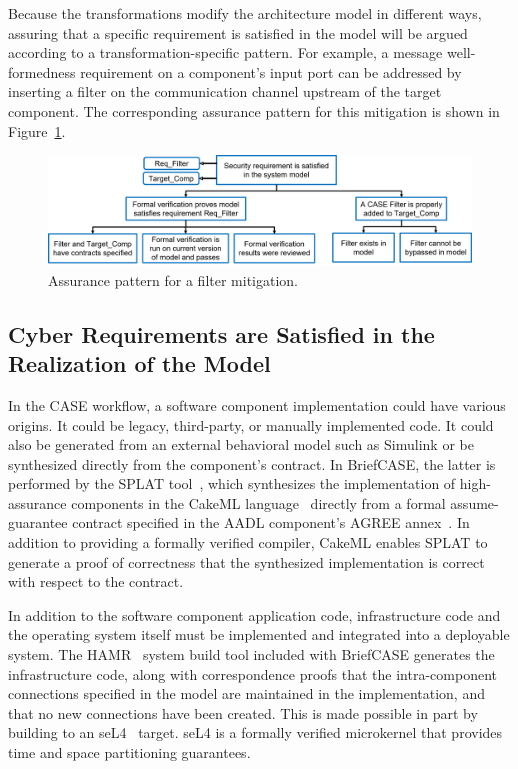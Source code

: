 Because the transformations modify the architecture model in different ways, assuring that a specific requirement is satisfied in the model will be argued according to a transformation-specific pattern.  For example, a message well-formedness requirement on a component's input port can be addressed by inserting a filter on the communication channel upstream of the target component.  The corresponding assurance pattern for this mitigation is shown in Figure~\ref{fig:filter}.

\begin{figure}[h] 
	\centering 
	\includegraphics[width=\textwidth]{figs/filter.png}
	\caption{Assurance pattern for a filter mitigation.}
	\label{fig:filter} 
\end{figure}

\subsection{Cyber Requirements are Satisfied in the Realization of the Model}

In the CASE workflow, a software component implementation could have various origins.  It could be legacy, third-party, or manually implemented code. It could also be generated from an external behavioral model such as Simulink or be synthesized directly from the component's contract.  In BriefCASE, the latter is performed by the SPLAT tool~\cite{case-verified-filter}, which synthesizes the implementation of high-assurance components in the CakeML language~\cite{cakeml} directly from a formal assume-guarantee contract specified in the AADL component's AGREE annex~\cite{compositional-analysis-agree}.  In addition to providing a formally verified compiler, CakeML enables SPLAT to generate a proof of correctness that the synthesized implementation is correct with respect to the contract.

In addition to the software component application code, infrastructure code and the operating system itself must be implemented and integrated into a deployable system.  The HAMR~\cite{hamr} system build tool included with BriefCASE generates the infrastructure code, along with correspondence proofs that the intra-component connections specified in the model are maintained in the implementation, and that no new connections have been created.  This is made possible in part by building to an seL4~\cite{sel4-cacm18} target.  seL4 is a formally verified microkernel that provides time and space partitioning guarantees.  


